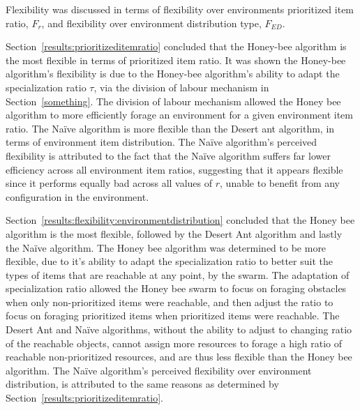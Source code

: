 Flexibility was discussed in terms of flexibility over environments prioritized item ratio, $F_r$, and flexibility over environment distribution type, $F_{ED}$. 

Section~\ref{results:prioritizeditemratio} concluded that the Honey-bee algorithm is the most flexible in terms of prioritized item ratio. It was shown the Honey-bee algorithm's flexibility is due to the Honey-bee algorithm's ability to adapt the specialization ratio $\tau$, via the division of labour mechanism in Section~\ref{something}. The division of labour mechanism allowed the Honey bee algorithm to more efficiently forage an environment for a given environment item ratio. The Na\"ive algorithm is more flexible than the Desert ant algorithm, in terms of environment item distribution. The Na\"ive algorithm's perceived flexibility is attributed to the fact that the Na\"ive algorithm suffers far lower efficiency across all environment item ratios, suggesting that it appears flexible since it performs equally bad across all values of $r$, unable to benefit from any configuration in the environment. 

Section~\ref{results:flexibility:environmentdistribution} concluded that the Honey bee algorithm is the most flexible, followed by the Desert Ant algorithm and lastly the Na\"ive algorithm. The Honey bee algorithm was determined to be more flexible, due to it's ability to adapt the specialization ratio to better suit the types of items that are reachable at any point, by the swarm. The adaptation of specialization ratio allowed the Honey bee swarm to focus on foraging obstacles when only non-prioritized items were reachable, and then adjust the ratio to focus on foraging prioritized items when prioritized items were reachable. The Desert Ant and Na\"ive algorithms, without the ability to adjust to changing ratio of the reachable objects, cannot assign more resources to forage a high ratio of reachable non-prioritized resources, and are thus less flexible than the Honey bee algorithm.
  The Na\"ive algorithm's perceived flexibility over environment distribution, is attributed to the same reasons as determined by Section~\ref{results:prioritizeditemratio}. 
  
